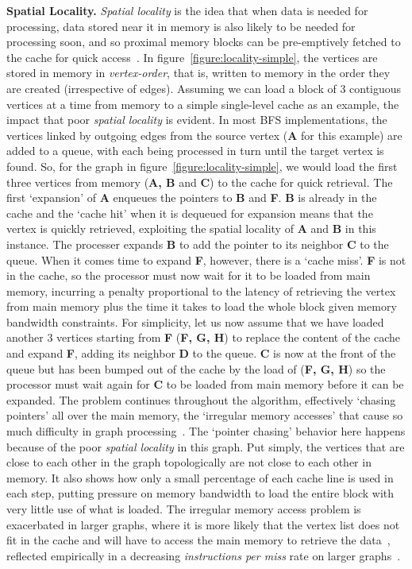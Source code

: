 \textbf{Spatial Locality.} 
\textit{Spatial locality} is the idea that when data is needed for processing, data stored near it in memory is also likely to be needed for processing soon, and so proximal memory blocks can be pre-emptively fetched to the cache for quick access~\cite{Hennessy2019}.
In figure~\ref{figure:locality-simple}, the vertices are stored in memory in \textit{vertex-order}, that is, written to memory in the order they are created (irrespective of edges).
Assuming we can load a block of $3$ contiguous vertices at a time from memory to a simple single-level cache as an example, the impact that poor \textit{spatial locality} is evident.
In most BFS implementations, the vertices linked by outgoing edges from the source vertex (\textbf{A} for this example) are added to a queue, with each being processed in turn until the target vertex is found. 
So, for the graph in figure~\ref{figure:locality-simple}, we would load the first three vertices from memory (\textbf{A, B} and \textbf{C}) to the cache for quick retrieval. 
The first `expansion' of \textbf{A} enqueues the pointers to \textbf{B} and \textbf{F}.
\textbf{B} is already in the cache and the `cache hit' when it is dequeued for expansion means that the vertex is quickly retrieved, exploiting the spatial locality of \textbf{A} and \textbf{B} in this instance. 
The processer expands \textbf{B} to add the pointer to its neighbor \textbf{C} to the queue.
When it comes time to expand \textbf{F}, however, there is a `cache miss'.
\textbf{F} is not in the cache, so the processor must now wait for it to be loaded from main memory, incurring a penalty proportional to the latency of retrieving the vertex from main memory plus the time it takes to load the whole block given memory bandwidth constraints. 
For simplicity, let us now assume that we have loaded another $3$ vertices starting from \textbf{F} (\textbf{F, G, H}) to replace the content of the cache and expand \textbf{F}, adding its neighbor \textbf{D} to the queue. 
\textbf{C} is now at the front of the queue but has been bumped out of the cache by the load of (\textbf{F, G, H}) so the processor must wait again for \textbf{C} to be loaded from main memory before it can be expanded. 
The problem continues throughout the algorithm, effectively `chasing pointers' all over the main memory, the `irregular memory accesses' that cause so much difficulty in graph processing~\cite{Beamer2015}.
The `pointer chasing' behavior here happens because of the poor \textit{spatial locality} in this graph.
Put simply, the vertices that are close to each other in the graph topologically are not close to each other in memory. 
It also shows how only a small percentage of each cache line is used in each step, putting pressure on memory bandwidth to load the entire block with very little use of what is loaded. 
The irregular memory access problem is exacerbated in larger graphs, where it is more likely that the vertex list does not fit in the cache and will have to access the main memory to retrieve the data~\cite{Chung2012}, reflected empirically in a decreasing \textit{instructions per miss} rate on larger graphs~\cite{Beamer2015}.

